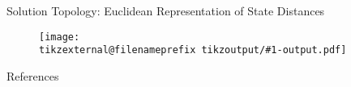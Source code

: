 \documentclass[final, xcolor={svgnames}]{beamer}
\makeatletter
\newif\iftikzex
\newcommand*{\useexternalfile}[1]{%
		\iftikzex
			\tikzsetnextfilename{tikzoutput/#1-output}%
			\scalebox{1}{}
		\else
			\texttt{[image: \\tikzexternal@filenameprefix tikzoutput/\#1-output.pdf]}
		\fi
	}
\newlength{\sepwidth}
\newlength{\colwidth}
\newcommand{\separatorcolumn}{\begin{column}{\sepwidth}\end{column}}
\makeatother
\begin{document}
\begin{frame}[t]
\begin{columns}[t]
\begin{column}{\colwidth}
		\begin{block}{Solution Topology: Euclidean Representation of State Distances}
			\begin{figure}
				\useexternalfile{AAdashpolytope}
				\caption{}
				\label{fig:AAdashpolytope}
			\end{figure}
		\end{block}
	
	  \begin{block}{References}
	
	    \AtNextBibliography{\footnotesize}
	    \nocite{*}
	    \printbibliography[title=none]
	
	  \end{block}
	
	\end{column}
	
	\separatorcolumn
\end{columns}
\end{frame}
\end{document}
